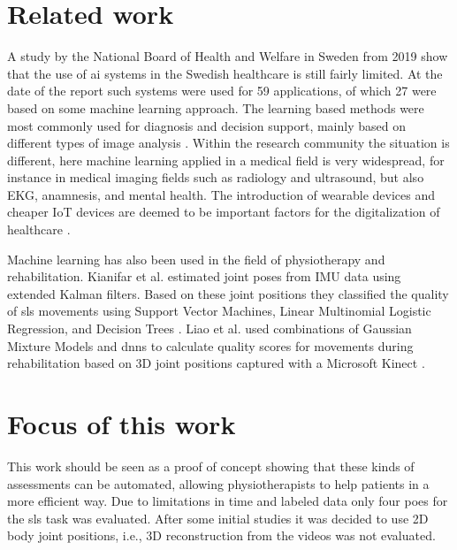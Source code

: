 \section{Related work}
A study by the National Board of Health and Welfare in Sweden from 2019 show that the use of \gls{ai} systems in the Swedish healthcare is still fairly limited. At the date of the report such systems were used for 59 applications, of which 27 were based on some machine learning approach. The learning based methods were most commonly used for diagnosis and decision support, mainly based on different types of image analysis \cite{soc2019}. Within the research community the situation is different, here machine learning applied in a medical field is very widespread, for instance in medical imaging fields such as radiology and ultrasound, but also EKG, anamnesis, and mental health. The introduction of wearable devices and cheaper IoT devices are deemed to be important factors for the digitalization of healthcare \cite{Topol2019}.

Machine learning has also been used in the field of physiotherapy and rehabilitation. Kianifar et al. estimated joint poses from IMU data using extended Kalman filters. Based on these joint positions they classified the quality of \gls{sls} movements using Support Vector Machines, Linear Multinomial Logistic Regression, and Decision Trees \cite{Kianifar2016}. Liao et al. used combinations of Gaussian Mixture Models and \glspl{dnn} to calculate quality scores for movements during rehabilitation based on 3D joint positions captured with a Microsoft Kinect \cite{Liao2020}.


\section{Focus of this work}
This work should be seen as a proof of concept showing that these kinds of assessments can be automated, allowing physiotherapists to help patients in a more efficient way. Due to limitations in time and labeled data only four \glspl{poe} for the \gls{sls} task was evaluated. After some initial studies it was decided to use 2D body joint positions, i.e., 3D reconstruction from the videos was not evaluated.


